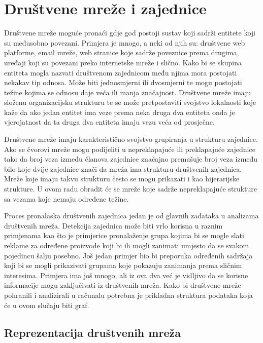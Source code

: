 \chapter{Društvene mreže i zajednice}

Društvene mreže moguće pronaći gdje god postoji sustav koji sadrži entitete koji su međusobno povezani. Primjera je mnogo, a neki od njih su: društvene web platforme, email mreže, web stranice koje sadrže poveznice prema drugima, uređaji koji su povezani preko internetske mreže i slično. 
Kako bi se skupina entiteta mogla nazvati društvenom zajednicom među njima mora postojati nekakav tip odnosa. Može biti jednosmjerni ili dvosmjerni te mogu postojati težine kojima se odnosu daje veća ili manja značajnost. Društvene mreže imaju složenu organizacijsku strukturu te se može pretpostaviti svojstvo lokalnosti koje kaže da ako jedan entitet ima veze prema neka druga dva entiteta onda je vjerojatnost da ta druga dva entiteta imaju vezu veća od prosječne. 

Društvene mreže imaju karakteristično svojstvo grupiranja u strukturu zajednice. Ako se čvorovi mreže mogu podijeliti u nepreklapajuće ili preklapajuće zajednice tako da broj veza između članova zajednice značajno premašuje broj veza između bilo koje dvije zajednice znači da mreža ima strukturu društvenih zajednica. Mreže koje imaju takvu strukturu često se mogu prikazati i kao hijerarijske strukture. U ovom radu obradit će se mreže koje sadrže nepreklapajuće strukture sa vezama koje nemaju određene težine.

Proces pronalaska društvenih zajednica jedan je od glavnih zadataka u analizama društvenih mreža. Detekcija zajednica može biti vrlo korisna u raznim primjenama kao što je primjerice pronalaženje grupa kojima bi se mogle slati reklame za određene proizvode koji bi ih mogli zanimati umjesto da se svakom pojedincu šalju posebno. Još jedan primjer bio bi preporuka određenih sadržaja koji bi se mogli prikazivati grupama koje pokazuju zanimanja prema sličnim interesima. Primjera ima još mnogo, ali iz ova dva već je vidljivo da se korisne informacije mogu zaključivati iz društvenih mreža. Kako bi društvene mreže pohranili i analizirali u računalu potrebna je prikladna struktura podataka koja će u ovom slučaju biti graf.

\section{Reprezentacija društvenih mreža}

